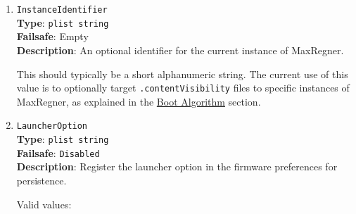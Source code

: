 \documentclass[]{article}
\providecommand{\tightlist}{%
  \setlength{\itemsep}{0pt}\setlength{\parskip}{0pt}}
\begin{document}
\begin{enumerate}
  An entry is considered auxiliary when at least one of the following applies:

  \begin{itemize}
  \tightlist
    \item Entry is macOS recovery.
    \item Entry is macOS Time Machine.
    \item Entry is explicitly marked as \texttt{Auxiliary}.
    \item Entry is system (e.g. \texttt{Reset NVRAM}).
  \end{itemize}

  To display all entries, the picker menu can be reloaded into ``Extended Mode'' by pressing the
  \texttt{Spacebar} key. Hiding auxiliary entries may increase boot performance on multi-disk systems.


\item
  \texttt{InstanceIdentifier}\\
  \textbf{Type}: \texttt{plist\ string}\\
  \textbf{Failsafe}: Empty\\
  \textbf{Description}: An optional identifier for the current instance of MaxRegner.

  This should typically be a short alphanumeric string. The current use of this value is
  to optionally target \texttt{.contentVisibility} files to specific instances of MaxRegner,
  as explained in the \hyperref[bootalgorithm]{Boot Algorithm} section.

\item
  \texttt{LauncherOption}\\
  \textbf{Type}: \texttt{plist\ string}\\
  \textbf{Failsafe}: \texttt{Disabled}\\
  \textbf{Description}: Register the launcher option in the firmware preferences for persistence.

  Valid values:


\end{enumerate}
\end{document}
